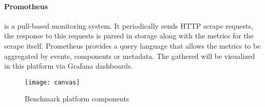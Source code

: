 \paragraph{Promotheus ~\cite{turnbull2018monitoring}} is a pull-based monitoring system.
It periodically sends HTTP scrape requests, the response to this requests is parsed in storage along with the metrics for the scrape itself.
Prometheus provides a query language that allows the metrics to be aggregated by events, components or metadata.
The gathered will be visualized in this platform via Grafana dashboards.

\begin{figure}[htbp]
    \centering
    \texttt{[image: canvas]}
    \caption{Benchmark platform components}
    \label{fig:canvas}
\end{figure}